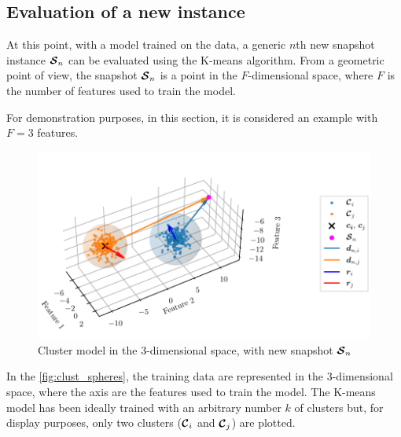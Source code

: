 \subsection{Evaluation of a new instance}

At this point, with a model trained on the data, a generic $n$th new snapshot instance $\bm{\mathcal{S}}_n$ can be evaluated using the K-means algorithm.
From a geometric point of view, the snapshot $\bm{\mathcal{S}}_n$ is a point in the ${F}$-dimensional space, where ${F}$ is the number of features used to train the model.

For demonstration purposes, in this section, it is considered an example with ${F}=3$ features.

\begin{figure}[htbp]
  \centering
  \includegraphics[width=\textwidth]{images/Spheres_2.pdf}
\caption{Cluster model in the $3$-dimensional space, with new snapshot $\bm{\mathcal{S}}_n$}
\label{fig:clust_spheres}
\end{figure}

In the \autoref{fig:clust_spheres}, the training data are represented in the $3$-dimensional space, where the axis are the features used to train the model. The K-means model has been ideally trained with an arbitrary number $k$ of clusters but, for display purposes, only two clusters  ($\bm{\mathcal{C}}_i$ and $\bm{\mathcal{C}}_j$) are plotted. 
